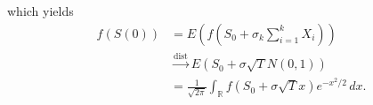 \documentclass[12pt]{article}
\newcommand{\rr}{\mathbb{R}}
\theoremstyle{plain}
\theoremstyle{definition}
\theoremstyle{remark}
\numberwithin{equation}{section}  %
\begin{document}
	which yields 
	\begin{equation*}
		\begin{split}
			f(S(0)) & = E(f(S_{0} + \sigma_{k} \sum_{i=1}^{k} X_{i}))
			\\
			& \xrightarrow{\text{dist}} E(S_{0} + \sigma \sqrt{T}N(0,1))
			\\
			& = \frac{1}{\sqrt{2 \pi}} \int_{\rr} f(S_{0} + \sigma \sqrt{T}x)
			e^{-x^{2}/2}
			\, dx. 
		\end{split}
	\end{equation*}
	
\end{document}
